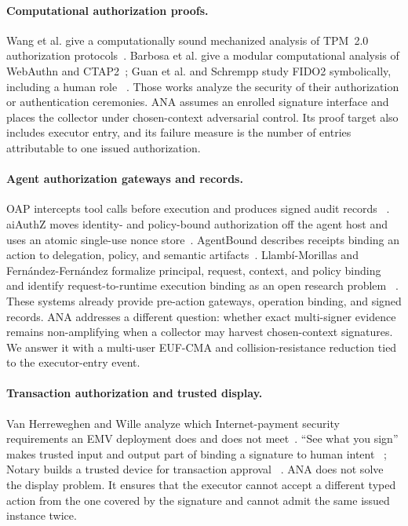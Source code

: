 \documentclass[10pt]{article}
\begin{document}
\paragraph{Computational authorization proofs.}
Wang et al. give a computationally sound mechanized analysis of TPM~2.0
authorization protocols~\cite{tpm20auth}. Barbosa et al. give a modular
computational analysis of WebAuthn and CTAP2~\cite{fido2provable}; Guan et al.
and Schrempp study FIDO2 symbolically, including a human role
~\cite{fido2symbolic,fido2human}. Those works analyze the security of their
authorization or authentication ceremonies. ANA assumes an enrolled signature
interface and places the collector under chosen-context adversarial control. Its
proof target also includes executor entry, and its failure measure is the number
of entries attributable to one issued authorization.

\paragraph{Agent authorization gateways and records.}
OAP intercepts tool calls before execution and produces signed audit records
~\cite{oap26}. aiAuthZ moves identity- and policy-bound authorization off the
agent host and uses an atomic single-use nonce store~\cite{aiauthz26}.
AgentBound describes receipts binding an action to delegation, policy, and
semantic artifacts~\cite{agentbound26}. Llamb\'i-Morillas and
Fern\'andez-Fern\'andez formalize principal, request, context, and policy binding
and identify request-to-runtime execution binding as an open research problem
~\cite{cva26}. These systems already provide pre-action gateways, operation
binding, and signed records. ANA addresses a different question: whether exact
multi-signer evidence remains non-amplifying when a collector may harvest
chosen-context signatures. We answer it with a multi-user EUF-CMA and
collision-resistance reduction tied to the executor-entry event.

\paragraph{Transaction authorization and trusted display.}
Van Herreweghen and Wille analyze which Internet-payment security requirements
an EMV deployment does and does not meet~\cite{herreweghen99}. ``See what you sign'' makes
trusted input and output part of binding a signature to human intent
~\cite{weber98}; Notary builds a trusted device for transaction approval
~\cite{notary20}. ANA does not solve the display problem. It ensures that the
executor cannot accept a different typed action from the one covered by the
signature and cannot admit the same issued instance twice.
\end{document}
